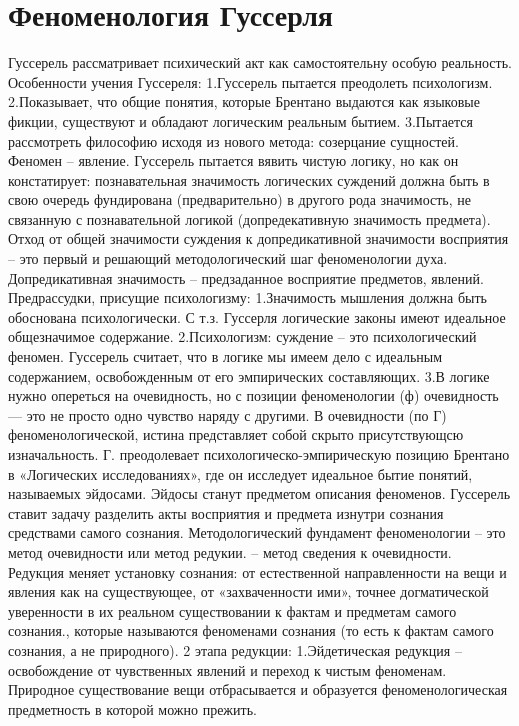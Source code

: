 \documentclass[12pt]{article}
\begin{document}
\section{Феноменология Гуссерля}
Гуссерель  рассматривает  психический  акт  как  самостоятельну  особую  реальность.  Особенности  учения
Гуссереля:
1.Гуссерель пытается преодолеть психологизм.
2.Показывает, что общие понятия, которые Брентано выдаются как языковые фикции, существуют и обладают
логическим реальным бытием.
3.Пытается рассмотреть философию исходя из нового метода: созерцание сущностей.
Феномен – явление.
Гуссерель пытается вявить чистую логику, но как он констатирует: познавательная значимость логических
суждений должна быть в свою очередь фундирована (предварительно) в другого рода значимость, не связанную
с познавательной логикой (допредекативную значимость предмета). Отход от общей значимости суждения к
допредикативной значимости восприятия – это первый и решающий методологический шаг феноменологии
духа. Допредикативная значимость – предзаданное восприятие предметов, явлений.
Предрассудки, присущие психологизму:
1.Значимость мышления должна быть обоснована психологически. С т.з. Гуссерля логические законы имеют
идеальное общезначимое содержание.
2.Психологизм: суждение – это психологический феномен. Гуссерель считает, что в логике мы имеем дело с
идеальным содержанием, освобожденным от его эмпирических составляющих.
3.В логике нужно опереться на очевидность, но с позиции феноменологии (ф) очевидность — это не просто
одно чувство наряду с другими. В очевидности (по Г) феноменологической, истина представляет собой скрыто
присутствующсю  изначальность.  Г.  преодолевает  психологическо-эмпирическую  позицию  Брентано  в
«Логических  исследованиях»,  где  он  исследует  идеальное  бытие  понятий,  называемых  эйдосами.  Эйдосы
станут предметом описания феноменов.
Гуссерель ставит задачу разделить акты восприятия и предмета изнутри сознания средствами самого сознания.
Методологический фундамент феноменологии – это метод очевидности или метод редукии. – метод сведения к
очевидности.
Редукция  меняет  установку  сознания:  от  естественной  направленности  на  вещи  и  явления  как  на
существующее, от «захваченности ими», точнее догматической уверенности в их реальном существовании к
фактам и предметам самого сознания., которые называются феноменами сознания (то есть к фактам самого
сознания, а не природного).
2 этапа редукции:
1.Эйдетическая редукция – освобождение от чувственных явлений и переход к чистым феноменам. Природное
существование вещи отбрасывается и образуется феноменологическая предметность в которой можно прежить.
\end{document}
